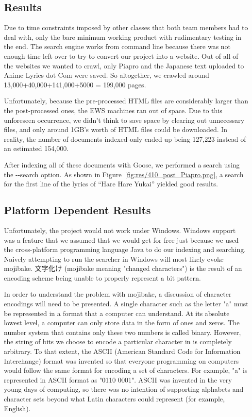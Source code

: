\documentclass{acm} %
\begin{document}
\begin{CJK}{UTF8}{zhsong}
\section{Results}

Due to time constraints imposed by other classes that both team members had to deal with, only the bare minimum working product with rudimentary testing in the end. The search engine works from command line because there was not enough time left over to try to convert our project into a website. Out of all of the websites we wanted to crawl, only Piapro and the Japanese text uploaded to Anime Lyrics dot Com were saved. So altogether, we crawled around 13,000+40,000+141,000+5000 = 199,000 pages.

Unfortunately, because the pre-processed HTML files are considerably larger than the post-processed ones, the EWS machines ran out of space. Due to this unforeseen occurrence, we didn't think to save space by clearing out unnecessary files, and only around 1GB's worth of HTML files could be downloaded. In reality, the number of documents indexed only ended up being 127,223 instead of an estimated 154,000.

After indexing all of these documents with Goose, we performed a search using the -{}-search option. As shown in Figure~\ref{fig:res/410_post_Piapro.png}, a search for the first line of the lyrics of ``Hare Hare Yukai'' yielded good results.


\subsection{Platform Dependent Results}

Unfortunately, the project would not work under Windows. Windows support was a feature that we assumed that we would get for free just because we used the cross-platform programming language Java to do our indexing and searching. Naively attempting to run the searcher in Windows will most likely evoke mojibake. 文字化け (mojibake meaning "changed characters") is the result of an encoding scheme being unable to properly represent a bit pattern.

In order to understand the problem with mojibake, a discussion of character encodings will need to be presented. A single character such as the letter "a" must be represented in a format that a computer can understand. At its absolute lowest level, a computer can only store data in the form of ones and zeros. The number system that contains only these two numbers is called binary. However, the string of bits we choose to encode a particular character in is completely arbitrary. To that extent, the ASCII (American Standard Code for Information Interchange) format was invented so that everyone programming on computers would follow the same format for encoding a set of characters. For example, "a" is represented in ASCII format as "0110 0001". ASCII was invented in the very young days of computing, so there was no intention of supporting alphabets and character sets beyond what Latin characters could represent (for example, English).


\end{CJK}
\end{document}

